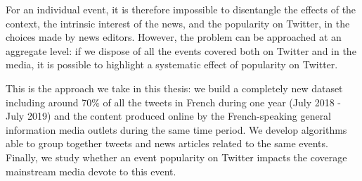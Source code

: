 For an individual event, it is therefore impossible to disentangle the effects of the context, the intrinsic interest of the news, and the popularity on Twitter, in the choices made by news editors. However, the problem can be approached at an aggregate level: if we dispose of all the events covered both on Twitter and in the media, it is possible to highlight a systematic effect of popularity on Twitter. 

This is the approach we take in this thesis: we build a completely
new dataset including around 70\% of all the tweets in French during one year (July 2018 - July 2019) and the content produced online by the French-speaking general information media outlets during the same time period. We develop algorithms able to group together tweets and news articles related to the same events. Finally, we study whether an event popularity on Twitter impacts the coverage mainstream media devote to this event.

